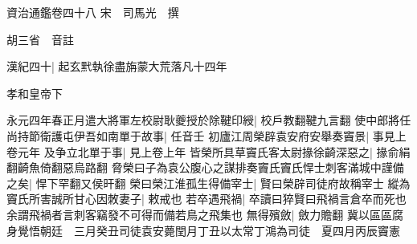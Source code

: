 資治通鑑卷四十八
宋　司馬光　撰

胡三省　音註

漢紀四十|{
	起玄黓執徐盡旃蒙大荒落凡十四年}


孝和皇帝下

永元四年春正月遣大將軍左校尉耿夔授於除鞬印綬|{
	校戶教翻鞬九言翻}
使中郎將任尚持節衛護屯伊吾如南單于故事|{
	任音壬}
初廬江周榮辟袁安府安舉奏竇景|{
	事見上卷元年}
及争立北單于事|{
	見上卷上年}
皆榮所具草竇氏客太尉掾徐齮深惡之|{
	掾俞絹翻齮魚倚翻惡烏路翻}
脅榮曰子為袁公腹心之謀排奏竇氏竇氏悍士刺客滿城中謹備之矣|{
	悍下罕翻又侯旰翻}
榮曰榮江淮孤生得備宰士|{
	賢曰榮辟司徒府故稱宰士}
縱為竇氏所害誠所甘心因敇妻子|{
	敕戒也}
若卒遇飛禍|{
	卒讀曰猝賢曰飛禍言倉卒而死也余謂飛禍者言刺客竊發不可得而備若鳥之飛集也}
無得殯斂|{
	斂力贍翻}
冀以區區腐身覺悟朝廷　三月癸丑司徒袁安薨閏月丁丑以太常丁鴻為司徒　夏四月丙辰竇憲

